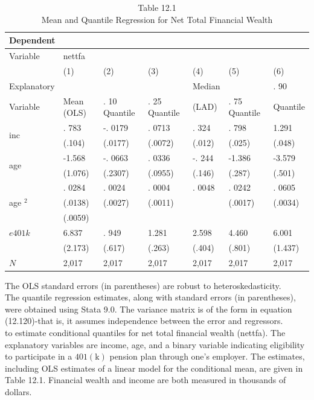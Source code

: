 \documentclass[10pt]{article}
\begin{document}
\begin{table}[h]
\begin{center}
\captionsetup{labelformat=empty}
\caption{Table 12.1\\
Mean and Quantile Regression for Net Total Financial Wealth}
\begin{tabular}{|l|l|l|l|l|l|l|}
\hline
\multicolumn{7}{|l|}{Dependent} \\
\hline
Variable & \multicolumn{6}{|l|}{nettfa} \\
\hline
 & (1) & (2) & (3) & (4) & (5) & (6) \\
\hline
Explanatory &  &  &  & Median &  & . 90 \\
\hline
Variable & Mean (OLS) & . 10 Quantile & . 25 Quantile & (LAD) & . 75 Quantile & Quantile \\
\hline
\multirow[t]{2}{*}{inc} & . 783 & -. 0179 & . 0713 & . 324 & . 798 & 1.291 \\
\hline
 & (.104) & (.0177) & (.0072) & (.012) & (.025) & (.048) \\
\hline
\multirow[t]{2}{*}{age} & -1.568 & -. 0663 & . 0336 & -. 244 & -1.386 & -3.579 \\
\hline
 & (1.076) & (.2307) & (.0955) & (.146) & (.287) & (.501) \\
\hline
\multirow[t]{3}{*}{age ${ }^{2}$} & . 0284 & . 0024 & . 0004 & . 0048 & . 0242 & . 0605 \\
\hline
 & (.0138) & (.0027) & (.0011) &  & (.0017) & (.0034) \\
\hline
 & (.0059) &  &  &  &  &  \\
\hline
$e 401 k$ & 6.837 & . 949 & 1.281 & 2.598 & 4.460 & 6.001 \\
\hline
 & (2.173) & (.617) & (.263) & (.404) & (.801) & (1.437) \\
\hline
$N$ & 2,017 & 2,017 & 2,017 & 2,017 & 2,017 & 2,017 \\
\hline
\end{tabular}
\end{center}
\end{table}

The OLS standard errors (in parentheses) are robust to heteroskedasticity.\\
The quantile regression estimates, along with standard errors (in parentheses), were obtained using Stata 9.0. The variance matrix is of the form in equation (12.120)-that is, it assumes independence between the error and regressors.\\
to estimate conditional quantiles for net total financial wealth (nettfa). The explanatory variables are income, age, and a binary variable indicating eligibility to participate in a $401(\mathrm{k})$ pension plan through one's employer. The estimates, including OLS estimates of a linear model for the conditional mean, are given in Table 12.1. Financial wealth and income are both measured in thousands of dollars.
\end{document}
